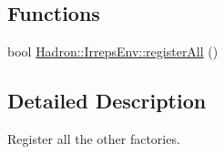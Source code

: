 \subsection*{Functions}
\begin{DoxyCompactItemize}
\item 
bool \mbox{\hyperlink{namespaceHadron_1_1IrrepsEnv_a17654fb199d3c0da80c640ff7e8c6c10}{Hadron\+::\+Irreps\+Env\+::register\+All}} ()
\end{DoxyCompactItemize}


\subsection{Detailed Description}
Register all the other factories. 


